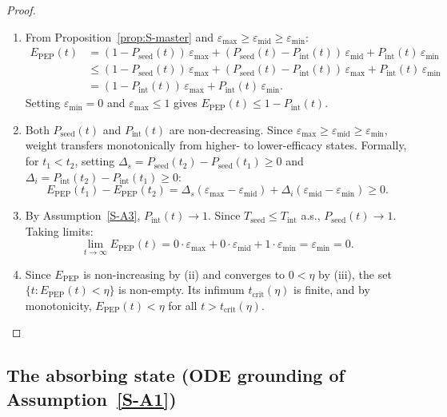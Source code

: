 \documentclass[12pt,a4paper]{article}
\theoremstyle{plain}
\theoremstyle{definition}
\theoremstyle{remark}
\newcommand{\Pint}{P_{\mathrm{int}}}
\newcommand{\Pseed}{P_{\mathrm{seed}}}
\newcommand{\Epep}{E_{\mathrm{PEP}}}
\newcommand{\tcrit}{t_{\mathrm{crit}}}
\begin{document}
\begin{proof}\leavevmode
\begin{enumerate}
    \item[(i)] From Proposition~\ref{prop:S-master} and $\varepsilon_{\max} \geq \varepsilon_{\mathrm{mid}} \geq \varepsilon_{\min}$:
    \begin{align*}
        \Epep(t) &= (1 - \Pseed(t))\,\varepsilon_{\max} + (\Pseed(t) - \Pint(t))\,\varepsilon_{\mathrm{mid}} + \Pint(t)\,\varepsilon_{\min} \\
        &\leq (1 - \Pseed(t))\,\varepsilon_{\max} + (\Pseed(t) - \Pint(t))\,\varepsilon_{\max} + \Pint(t)\,\varepsilon_{\min} \\
        &= (1 - \Pint(t))\,\varepsilon_{\max} + \Pint(t)\,\varepsilon_{\min}.
    \end{align*}
    Setting $\varepsilon_{\min} = 0$ and $\varepsilon_{\max} \leq 1$ gives $\Epep(t) \leq 1 - \Pint(t)$.

    \item[(ii)] Both $\Pseed(t)$ and $\Pint(t)$ are non-decreasing. Since $\varepsilon_{\max} \geq \varepsilon_{\mathrm{mid}} \geq \varepsilon_{\min}$, weight transfers monotonically from higher- to lower-efficacy states. Formally, for $t_1 < t_2$, setting $\Delta_s = \Pseed(t_2) - \Pseed(t_1) \geq 0$ and $\Delta_i = \Pint(t_2) - \Pint(t_1) \geq 0$:
    \[
        \Epep(t_1) - \Epep(t_2) = \Delta_s(\varepsilon_{\max} - \varepsilon_{\mathrm{mid}}) + \Delta_i(\varepsilon_{\mathrm{mid}} - \varepsilon_{\min}) \geq 0.
    \]

    \item[(iii)] By Assumption~\ref{S-A3}, $\Pint(t) \to 1$. Since $T_{\mathrm{seed}} \leq T_{\mathrm{int}}$ a.s., $\Pseed(t) \to 1$. Taking limits:
    \[
        \lim_{t \to \infty} \Epep(t) = 0 \cdot \varepsilon_{\max} + 0 \cdot \varepsilon_{\mathrm{mid}} + 1 \cdot \varepsilon_{\min} = \varepsilon_{\min} = 0.
    \]

    \item[(iv)] Since $\Epep$ is non-increasing by (ii) and converges to $0 < \eta$ by (iii), the set $\{t : \Epep(t) < \eta\}$ is non-empty. Its infimum $\tcrit(\eta)$ is finite, and by monotonicity, $\Epep(t) < \eta$ for all $t > \tcrit(\eta)$. \qedhere
\end{enumerate}
\end{proof}


\subsection{The absorbing state (ODE grounding of Assumption~\ref{S-A1})}\label{sec:S-absorbing}
\end{document}
